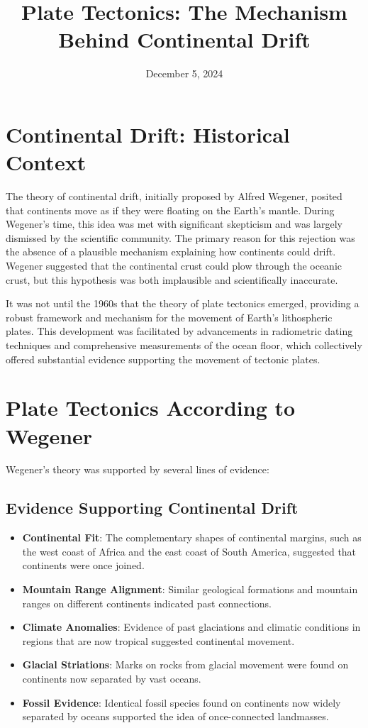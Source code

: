 \documentclass{article}
\begin{document}
\title{Plate Tectonics: The Mechanism Behind Continental Drift}
\author{}
\date{December 5, 2024}

\maketitle

\section{Continental Drift: Historical Context}

The theory of continental drift, initially proposed by Alfred Wegener, posited that continents move as if they were floating on the Earth's mantle. During Wegener's time, this idea was met with significant skepticism and was largely dismissed by the scientific community. The primary reason for this rejection was the absence of a plausible mechanism explaining how continents could drift. Wegener suggested that the continental crust could plow through the oceanic crust, but this hypothesis was both implausible and scientifically inaccurate.

It was not until the 1960s that the theory of plate tectonics emerged, providing a robust framework and mechanism for the movement of Earth's lithospheric plates. This development was facilitated by advancements in radiometric dating techniques and comprehensive measurements of the ocean floor, which collectively offered substantial evidence supporting the movement of tectonic plates.

\section{Plate Tectonics According to Wegener}

Wegener's theory was supported by several lines of evidence:

\subsection{Evidence Supporting Continental Drift}
\begin{itemize}
    \item \textbf{Continental Fit}: The complementary shapes of continental margins, such as the west coast of Africa and the east coast of South America, suggested that continents were once joined.
    \item \textbf{Mountain Range Alignment}: Similar geological formations and mountain ranges on different continents indicated past connections.
    \item \textbf{Climate Anomalies}: Evidence of past glaciations and climatic conditions in regions that are now tropical suggested continental movement.
    \item \textbf{Glacial Striations}: Marks on rocks from glacial movement were found on continents now separated by vast oceans.
    \item \textbf{Fossil Evidence}: Identical fossil species found on continents now widely separated by oceans supported the idea of once-connected landmasses.
\end{itemize}
\end{document}

